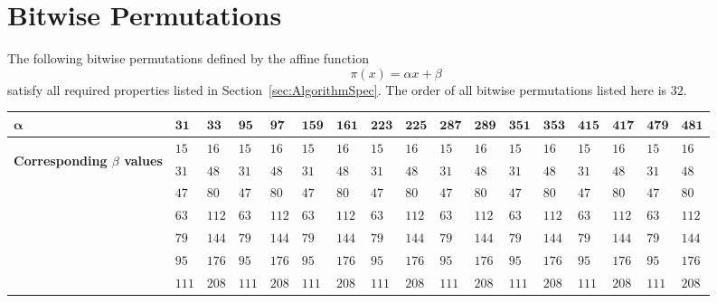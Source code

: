 \section{Bitwise Permutations}
\label{appx:BitwisePermutations}
The following bitwise permutations defined by the affine function
\begin{equation*}
\pi(x) = \alpha x + \beta
\end{equation*}
satisfy all required properties listed in Section~\ref{sec:AlgorithmSpec}.
The order of all bitwise permutations listed here is $32$.

\begin{table}[h]
\footnotesize
\begin{tabular}{l|l|l|l|l|l|l|l|l|l|l|l|l|l|l|l|l}
\normalsize $\mathbf{\alpha}$ &   $\mathbf{31}$ &   $\mathbf{33}$ &   $\mathbf{95}$ &   $\mathbf{97}$ &  $\mathbf{159}$ &  $\mathbf{161}$ &  $\mathbf{223}$ &  $\mathbf{225}$ &  $\mathbf{287}$ &  $\mathbf{289}$ &  $\mathbf{351}$ &  $\mathbf{353}$ &  $\mathbf{415}$ & $\mathbf{417}$ &  $\mathbf{479}$ &  $\mathbf{481}$ \\
\hline
\multirow{32}{*}{\begin{sideways}\normalsize \textbf{Corresponding $\beta$ values}\end{sideways}}
&   $15$ &   $16$ &   $15$ &   $16$ &   $15$ &   $16$ &   $15$ &   $16$ &   $15$ &   $16$ &   $15$ &   $16$ &   $15$ &   $16$ &   $15$ &   $16$ \\
&   $31$ &   $48$ &   $31$ &   $48$ &   $31$ &   $48$ &   $31$ &   $48$ &   $31$ &   $48$ &   $31$ &   $48$ &   $31$ &   $48$ &   $31$ &   $48$ \\
&   $47$ &   $80$ &   $47$ &   $80$ &   $47$ &   $80$ &   $47$ &   $80$ &   $47$ &   $80$ &   $47$ &   $80$ &   $47$ &   $80$ &   $47$ &   $80$ \\
&   $63$ &  $112$ &   $63$ &  $112$ &   $63$ &  $112$ &   $63$ &  $112$ &   $63$ &  $112$ &   $63$ &  $112$ &   $63$ &  $112$ &   $63$ &  $112$ \\
&   $79$ &  $144$ &   $79$ &  $144$ &   $79$ &  $144$ &   $79$ &  $144$ &   $79$ &  $144$ &   $79$ &  $144$ &   $79$ &  $144$ &   $79$ &  $144$ \\
&   $95$ &  $176$ &   $95$ &  $176$ &   $95$ &  $176$ &   $95$ &  $176$ &   $95$ &  $176$ &   $95$ &  $176$ &   $95$ &  $176$ &   $95$ &  $176$ \\
&  $111$ &  $208$ &  $111$ &  $208$ &  $111$ &  $208$ &  $111$ &  $208$ &  $111$ &  $208$ &  $111$ &  $208$ &  $111$ &  $208$ &  $111$ &  $208$ \\

\end{tabular}
\end{table}

